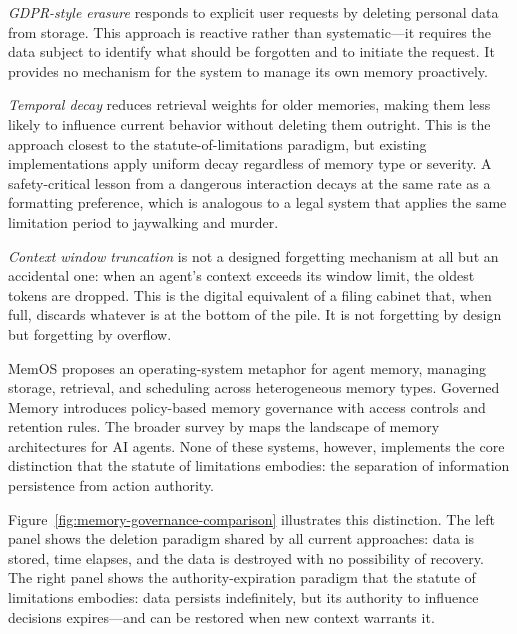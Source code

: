 \documentclass[12pt]{article}
\begin{document}
\emph{GDPR-style erasure} responds to explicit user requests by deleting personal data from storage. This approach is reactive rather than systematic---it requires the data subject to identify what should be forgotten and to initiate the request. It provides no mechanism for the system to manage its own memory proactively.

\emph{Temporal decay} reduces retrieval weights for older memories, making them less likely to influence current behavior without deleting them outright. This is the approach closest to the statute-of-limitations paradigm, but existing implementations apply uniform decay regardless of memory type or severity. A safety-critical lesson from a dangerous interaction decays at the same rate as a formatting preference, which is analogous to a legal system that applies the same limitation period to jaywalking and murder.

\emph{Context window truncation} is not a designed forgetting mechanism at all but an accidental one: when an agent's context exceeds its window limit, the oldest tokens are dropped. This is the digital equivalent of a filing cabinet that, when full, discards whatever is at the bottom of the pile. It is not forgetting by design but forgetting by overflow.

MemOS \citep{memos-2025} proposes an operating-system metaphor for agent memory, managing storage, retrieval, and scheduling across heterogeneous memory types. Governed Memory \citep{governed-memory-2026} introduces policy-based memory governance with access controls and retention rules. The broader survey by \citet{memory-ai-agents-2025} maps the landscape of memory architectures for AI agents. None of these systems, however, implements the core distinction that the statute of limitations embodies: the separation of information persistence from action authority.

Figure~\ref{fig:memory-governance-comparison} illustrates this distinction. The left panel shows the deletion paradigm shared by all current approaches: data is stored, time elapses, and the data is destroyed with no possibility of recovery. The right panel shows the authority-expiration paradigm that the statute of limitations embodies: data persists indefinitely, but its authority to influence decisions expires---and can be restored when new context warrants it.
\end{document}
